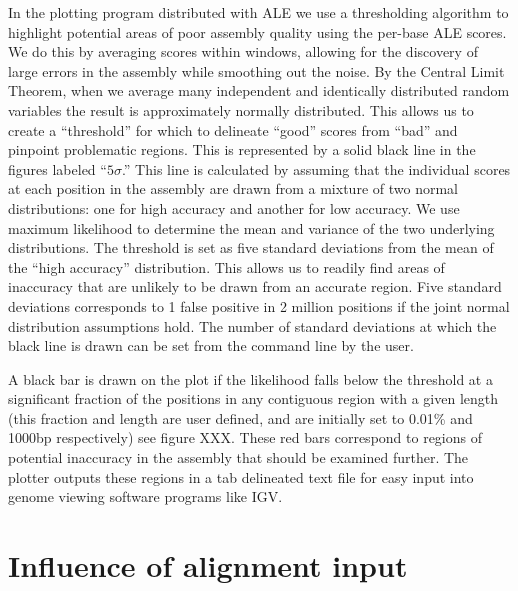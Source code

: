 \documentclass[phd,tocprelim]{cornell}
\begin{document}
In the plotting program distributed with ALE we use a thresholding algorithm to highlight potential areas of poor assembly quality using the per-base ALE scores. We do this by averaging scores within windows, allowing for the discovery of large errors in the assembly while smoothing out the noise. By the Central Limit Theorem, when we average many independent and identically distributed random variables the result is approximately normally distributed. This allows us to create a “threshold” for which to delineate “good” scores from “bad” and pinpoint problematic regions. This is represented by a solid black line in the figures labeled “$5\sigma$.” This line is calculated by assuming that the individual scores at each position in the assembly are drawn from a mixture of two normal distributions: one for high accuracy and another for low accuracy. We use maximum likelihood to determine the mean and variance of the two underlying distributions. The threshold is set as five standard deviations from the mean of the “high accuracy” distribution. This allows us to readily find areas of inaccuracy that are unlikely to be drawn from an accurate region. Five standard deviations corresponds to 1 false positive in 2 million positions if the joint normal distribution assumptions hold.  The number of standard deviations at which the black line is drawn can be set from the command line by the user.

A black bar is drawn on the plot if the likelihood falls below the threshold at a significant fraction of the positions in any contiguous region with a given length (this fraction and length are user defined, and are initially set to 0.01\% and 1000bp respectively) see figure XXX. These red bars correspond to regions of potential inaccuracy in the assembly that should be examined further. The plotter outputs these regions in a tab delineated text file for easy input into genome viewing software programs like IGV.


\section{Influence of alignment input} %
\label{sec:Influence of alignment input}
\end{document}
